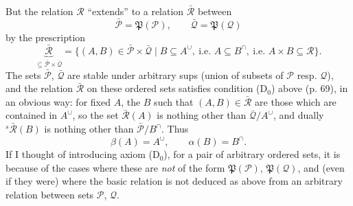 \documentclass[11pt]{article}
\newcommand{\printedpage}[1]{\marginpar{\footnotesize p.~#1}}
\newcommand{\msp}[1]{\marginpar{\footnotesize [#1]}}
\newcommand{\cP}{\mathcal{P}}
\newcommand{\cQ}{\mathcal{Q}}
\newcommand{\cR}{\mathcal{R}}
\newcommand{\fP}{\mathfrak{P}}
\begin{document}
But the relation $\cR$ ``extends'' to a relation $\bar{\cR}$ between
\[
\bar{\cP} = \fP(\cP), \qquad \bar{\cQ} = \fP(\cQ)
\tag*{(5.13)}
\]
by the prescription
\[
\underbrace{\bar{\cR}}_{\subseteq \bar{\cP} \times \bar{\cQ}} = \{(A,B) \in \bar{\cP} \times \bar{\cQ} \mid B \subseteq A^{\cup},\ \text{i.e. } A \subseteq B^{\cap},\ \text{i.e. } A \times B \subseteq \cR\}.
\tag*{(5.14)}
\]
The sets $\bar{\cP}$, $\bar{\cQ}$ are stable under arbitrary sups (union of subsets of $\cP$ resp. $\cQ$), and the relation $\bar{\cR}$ on these ordered sets satisfies condition (D$_0$)
\printedpage{46}
\msp{74}
above (p. 69), in an obvious way: for fixed $A$, the $B$ such that $(A,B) \in \bar{\cR}$ are those which are contained in $A^{\cup}$, so the set $\bar{\cR}(A)$ is nothing other than $\bar{\cQ}/A^{\cup}$, and dually ${}^{s}\bar{\cR}(B)$ is nothing other than $\bar{\cP}/B^{\cap}$. Thus
\[
\beta(A) = A^{\cup}, \qquad \alpha(B) = B^{\cap}.
\tag*{(5.14)} %
\]
If I thought of introducing axiom (D$_0$), for a pair of arbitrary ordered sets, it is because of the cases where these are \textit{not} of the form $\fP(\cP)$, $\fP(\cQ)$, and (even if they were) where the basic relation is not deduced as above from an arbitrary relation between sets $\cP$, $\cQ$.
\end{document}
